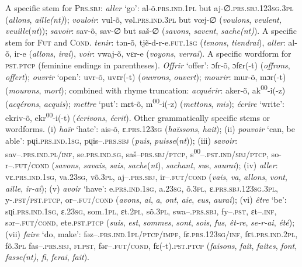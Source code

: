 \documentclass[output=paper, colorlinks,citecolor=brown]{langsci/langscibook}
\begin{document}
\ea \label{ex:andersen_5} \ea
      A specific stem for \textsc{Prs.sbj}: \textit{aller} ‘go': al-õ.\textsc{prs.ind.1pl} but aj-∅.\textsc{prs.sbj.123sg.3pl} (\textit{allons}, \textit{aille(nt)}); \textit{vouloir}: vul-õ, vøl.\textsc{prs.ind.3pl} but vœj-∅ (\textit{voulons}, \textit{veulent,} \textit{veuille}(\textit{nt})); \textit{savoir}: sav-õ, sav-∅ but saš-∅ (\textit{savons}, \textit{savent}, \textit{sache(nt)}).
\ex \label{ex:andersen_5b}
      A specific stem for \textsc{Fut} and \textsc{Cond}. \textit{tenir}: tǝn-õ, tjẽ-d-r-e.\textsc{fut.1sg} (\textit{tenons}, \textit{tiendrai}), \textit{aller}: al-õ, ir-e (\textit{allons}, \textit{irai}), \textit{voir}: vwaj-õ, vɛr-e (\textit{voyons}, \textit{verrai}).
\ex \label{ex:andersen_5c}
      A specific wordform for \textsc{pst.ptcp} (feminine endings in parentheses). \textit{Offrir} ‘offer': ɔfr-õ, ɔfɛr(-t) (\textit{offrons}, \textit{offert}); \textit{ouvrir} ‘open': uvr-õ, uvɛr(-t) (\textit{ouvrons}, \textit{ouvert}); \textit{mourir}: mur-õ, mɔr(-t) (\textit{mourons}, \textit{mort}); combined with rhyme truncation: \textit{acquérir}: aker-õ, ak\textsuperscript{00}{}-i(-z) (\textit{acqérons}, \textit{acquis}); \textit{mettre} ‘put': mɛt-õ, m\textsuperscript{00}{}-i(-z) (\textit{mettons}, \textit{mis}); \textit{écrire} ‘write': ekriv-õ, ekr\textsuperscript{00}{}-i(-t) (\textit{écrivons}, \textit{écrit}).
\ex \label{ex:andersen_5d}
      Other grammatically specific stems or wordforms. (i) \textit{haïr} ‘hate': ais-õ, ɛ.\textsc{prs.123sg} (\textit{haïssons}, \textit{hait});  (ii) \textit{pouvoir} ‘can, be able': pɥi.\textsc{prs.ind.1sg}, pɥis–.\textsc{prs.sbj} (\textit{puis}, \textit{puisse}(\textit{nt})); (iii) \textit{savoir}: sav–.\textsc{prs.ind.pl/inf}, se.\textsc{prs.ind.sg}, saš–\textsc{prs.sbj/ptcp}, s\textsuperscript{00}–.\textsc{pst.ind/sbj/ptcp}, so-r–.\textsc{fut/cond} (\textit{savons}, \textit{savais}, \textit{sais}, \textit{sache}(\textit{nt}), \textit{sachant}, \textit{su}s, \textit{saurai}); (iv) \textit{aller}: vɛ.\textsc{prs.ind.1sg}, va.\textsc{23sg}, võ.\textsc{3pl}, aj–.\textsc{prs.sbj}, ir–.\textsc{fut/cond} (\textit{vais}, \textit{va}, \textit{allons}, \textit{vont}, \textit{aille}, \textit{ir-ai});  (v) \textit{avoir} ‘have': e.\textsc{prs.ind.1sg}, a.\textsc{23sg}, õ.\textsc{3pl}, ɛ.\textsc{prs.sbj.123sg.3pl}, y-.\textsc{pst/pst.ptcp}, or–.\textsc{fut/cond} (\textit{avons}, \textit{ai}, \textit{a}, \textit{ont}, \textit{aie}, \textit{eus}, \textit{aurai}); (vi) \textit{être} ‘be': sɥi.\textsc{prs.ind.1sg}, ɛ.\textsc{23sg}, som.\textsc{1pl}, ɛt.\textsc{2pl}, sõ.\textsc{3pl}, swa–.\textsc{prs.sbj}, fy–.\textsc{pst}, ɛt–.\textsc{inf}, sǝr–.\textsc{fut/cond}, ete.\textsc{pst.ptcp} (\textit{suis}, \textit{est}, \textit{sommes}, \textit{sont}, \textit{sois}, \textit{fus}, \textit{êt-re}, \textit{se-r-ai}, \textit{été}); (vii) \textit{faire} ‘do, make': fǝz–.\textsc{prs.ind.1pl/ptcp/impf}, fɛ.\textsc{prs.123sg/inf}, fɛt.\textsc{prs.ind.2pl}, fõ.\textsc{3pl} fas–.\textsc{prs.sbj, fi.pst}, fǝr–.\textsc{fut/cond}, fɛ(-t).\textsc{pst.ptcp} (\textit{faisons}, \textit{fait}, \textit{faites}, \textit{font}, \textit{fasse(nt)}, \textit{fi}, \textit{ferai}, \textit{fait}).
    \z
    \z
\end{document}
